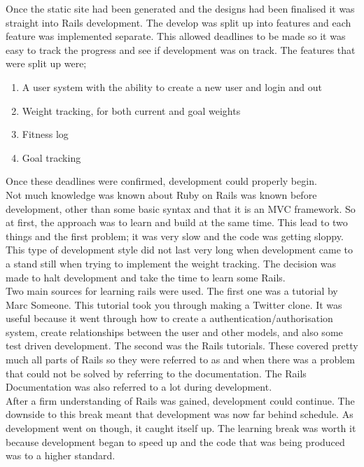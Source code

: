 Once the static site had been generated and the designs had been finalised it was straight into Rails development. The develop was split up into features and each feature was implemented separate. This allowed deadlines to be made so it was easy to track the progress and see if development was on track. The features that were split up were;

\begin{enumerate}
\item A user system with the ability to create a new user and login and out
\item Weight tracking, for both current and goal weights
\item Fitness log
\item Goal tracking
\end{enumerate}

\noindent
Once these deadlines were confirmed, development could properly begin.\\

Not much knowledge was known about Ruby on Rails was known before development, other than some basic syntax and that it is an MVC framework. So at first, the approach was to learn and build at the same time. This lead to two things and the first problem; it was very slow and the code was getting sloppy. This type of development style did not last very long when development came to a stand still when trying to implement the weight tracking. The decision was made to halt development and take the time to learn some Rails.\\

Two main sources for learning rails were used. The first one was a tutorial by Marc Someone. This tutorial took you through making a Twitter \citep{twitter:2006} clone. It was useful because it went through how to create a authentication/authorisation system, create relationships between the user and other models, and also some test driven development. The second was the Rails tutorials. These covered pretty much all parts of Rails so they were referred to as and when there was a problem that could not be solved by referring to the documentation. The Rails Documentation was also referred to a lot during development.\\

After a firm understanding of Rails was gained, development could continue. The downside to this break meant that development was now far behind schedule. As development went on though, it caught itself up. The learning break was worth it because development began to speed up and the code that was being produced was to a higher standard.\\

